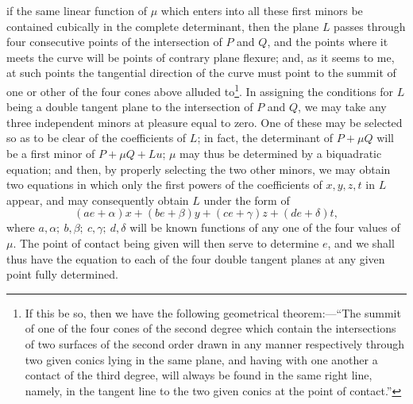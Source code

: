 \documentclass[11pt]{article}
\newcommand{\sourcepage}[1]{\marginpar{\scriptsize p.~#1}}
\begin{document}
{{\sourcepage{149}
if the same linear function of $\mu$ which enters into all these first minors be contained cubically in the complete determinant, then the plane $L$ passes through four consecutive points of the intersection of $P$ and $Q$, and the points where it meets the curve will be points of contrary plane flexure; and, as it seems to me, at such points the tangential direction of the curve must point to the summit of one or other of the four cones above alluded to\footnote{If this be so, then we have the following geometrical theorem:---``The summit of one of the four cones of the second degree which contain the intersections of two surfaces of the second order drawn in any manner respectively through two given conics lying in the same plane, and having with one another a contact of the third degree, will always be found in the same right line, namely, in the tangent line to the two given conics at the point of contact.''}. In assigning the conditions for $L$ being a double tangent plane to the intersection of $P$ and $Q$, we may take any three independent minors at pleasure equal to zero. One of these may be selected so as to be clear of the coefficients of $L$; in fact, the determinant of $P+\mu Q$ will be a first minor of $P+\mu Q+Lu$; $\mu$ may thus be determined by a biquadratic equation; and then, by properly selecting the two other minors, we may obtain two equations in which only the first powers of the coefficients of $x,y,z,t$ in $L$ appear, and may consequently obtain $L$ under the form of
\[
(ae+\alpha)x+(be+\beta)y+(ce+\gamma)z+(de+\delta)t,
\]
where $a,\alpha;\ b,\beta;\ c,\gamma;\ d,\delta$ will be known functions of any one of the four values of $\mu$. The point of contact being given will then serve to determine $e$, and we shall thus have the equation to each of the four double tangent planes at any given point fully determined.

}}
\end{document}
